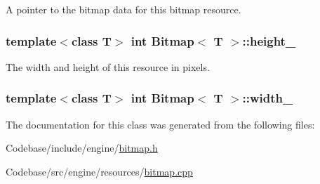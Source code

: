 A pointer to the bitmap data for this bitmap resource. 

\hypertarget{class_bitmap_a33d3c580113e2bf4a8b4767db2b936e2}{
\subsubsection[{height\-\_\-}]{\setlength{\rightskip}{0pt plus 5cm}template$<$class T$>$ int {\bf Bitmap}$<$ T $>$\-::{\bf height\-\_\-}}}\label{class_bitmap_a33d3c580113e2bf4a8b4767db2b936e2}


The width and height of this resource in pixels. 

\hypertarget{class_bitmap_a6f70d201f71c812dac30ac163281fd72}{
\subsubsection[{width\-\_\-}]{\setlength{\rightskip}{0pt plus 5cm}template$<$class T$>$ int {\bf Bitmap}$<$ T $>$\-::{\bf width\-\_\-}}}\label{class_bitmap_a6f70d201f71c812dac30ac163281fd72}


The documentation for this class was generated from the following files\-:\begin{DoxyCompactItemize}
\item 
Codebase/include/engine/\hyperlink{bitmap_8h}{bitmap.\-h}\item 
Codebase/src/engine/resources/\hyperlink{bitmap_8cpp}{bitmap.\-cpp}\end{DoxyCompactItemize}
